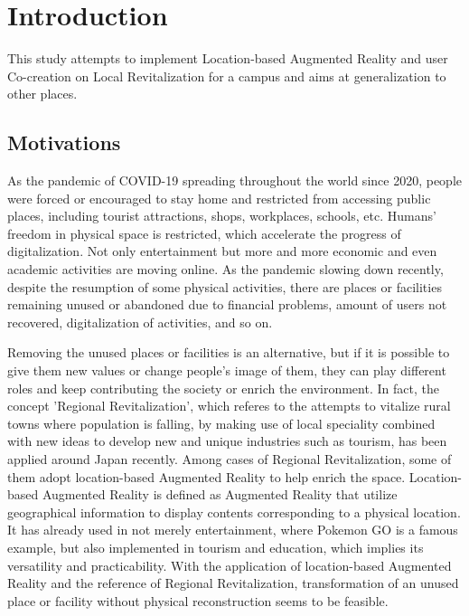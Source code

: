\chapter{Introduction}

This study attempts to implement Location-based Augmented Reality and user Co-creation on Local Revitalization for a campus and aims at generalization to other places.

\section{Motivations}

As the pandemic of COVID-19 spreading throughout the world since 2020,
people were forced or encouraged to stay home and restricted from accessing public places,
including tourist attractions, shops, workplaces, schools, etc.
Humans' freedom in physical space is restricted, which accelerate the progress of digitalization.
Not only entertainment but more and more economic and even academic activities are moving online.
As the pandemic slowing down recently, despite the resumption of some physical activities,
there are places or facilities remaining unused or abandoned due to financial problems,
amount of users not recovered, digitalization of activities, and so on.

Removing the unused places or facilities is an alternative, but if it is possible to give them new values or change people's image of them,
they can play different roles and keep contributing the society or enrich the environment.
In fact, the concept 'Regional Revitalization', which referes to the attempts to vitalize rural towns where population is falling,
by making use of local speciality combined with new ideas to develop new and unique industries such as tourism, has been applied around Japan recently.
Among cases of Regional Revitalization, some of them adopt location-based Augmented Reality to help enrich the space.
Location-based Augmented Reality is defined as Augmented Reality that utilize geographical information to display contents corresponding to a physical location.
It has already used in not merely entertainment, where Pokemon GO is a famous example,
but also implemented in tourism and education, which implies its versatility and practicability.
With the application of location-based Augmented Reality and the reference of Regional Revitalization,
transformation of an unused place or facility without physical reconstruction seems to be feasible.

